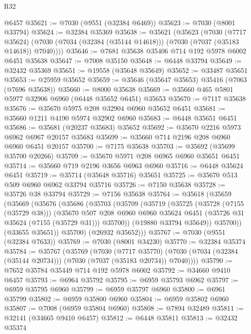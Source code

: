 \begin{lexlean}{R32}
\begin{coremodule}
    @6457
@35621 := @7030 (@9551 (@32384 @6469))
@35623 := @7030 (@8001 @33794)
@35624 := @32384 @35369
@35638 := @35621
    (@35623
      (@7030
        (@7717 @35624)
        (@7030 (@7034 (@32384 (@35144 @14618))) (@7030 (@7037 (@35183 @14618)) @7040))))
@35646 := @7681 @35638 @35406 @714 @192 @5978 @6002 @6451 @35638
@35647 := @7008 @35150
@35648 := @6448 @33794
@35649 := @32432 @35369
@35651 := @19558 (@35648 @35649)
@35652 := @33487 @35651
@35653 := @25959 @35652
@35659 := @35646 (@35647 @35653) @35416 (@7063 (@7696 @35638))
@35660 := @8000 @35638
@35669 := @35660 @465 @5801 @5977 @32906 @6960 (@6448 @35652 @6451) @35653
@35670 := @7117 @35638
@35676 := @35670 @5975 @208 @32904 @6960 @35652 @6451
@35681 := @35660 @1211 @4190 @5974 @32902 @6960
@35683 := @6448 @35651 @6451
@35686 := @35681 (@20237 @35683) @35652
@35692 := @35670 @2216 @5973 @6962 @6967 @20157 @35683
@35699 := @35660 @714 @2196 @208 @6960 @6960 @6451 @20157
@35700 := @7175 @35638
@35703 := @35692 (@35699 @35700 @20266)
@35709 := @35670 @5971 @208 @6965 @6960 @35651 @6451
@35714 := @35660 @719 @2196 @3656 @6963 @6960
@35716 := @6448 @35624 @6451
@35719 := @35714 (@35648 @35716) @35651
@35725 := @35670 @513 @509 @6960 @6962 @33794 @35716
@35726 := @7150 @35638
@35728 := @35726 @38 @33794
@35729 := @7156 @35638
@35764 := @35618
    (@35659
      (@35669
        (@35676
          (@35686
            (@35703
              (@35709
                (@35719
                  (@35725
                    (@35728 (@7155 (@35729 @38)))
                    (@35670
                      @507
                      @208
                      @6960
                      @6960
                      @35624
                      @6451
                      (@35726 @31 @35624 (@7155 (@35729 @31)))
                      @35700))
                  (@19880 @33794 @35649))
                @35700))
            (@33655 @35651))
          @35700)
        (@26932 @35652)))
@35767 := @7030 (@9551 (@32384 @7633))
@35769 := @7030 (@8001 @34230)
@35770 := @32384 @35374
@35784 := @35767
    (@35769
      (@7030
        (@7717 @35770)
        (@7030 (@7034 (@32384 (@35144 @20734))) (@7030 (@7037 (@35183 @20734)) @7040))))
@35790 := @7652 @35784 @35449 @714 @192 @5978 @6002
@35792 := @34660 @9410 @6457
@35793 := @6964 @35792
@35795 := @6959 @35793 @6962
@35797 := @6959 @35795 @6960
@35799 := @6959 @35797 @6960
@35800 := @6961 @35799
@35802 := @6959 @35800 @6960
@35804 := @6959 @35802 @6960
@35807 := @7008 (@6959 @35804 @6960)
@35808 := @7894 @32489
@35811 := @32141 (@34665 @9410 @6457)
@35812 := @6448 @35811
@35813 := @32432 @35374

\end{coremodule}
\end{lexlean}

